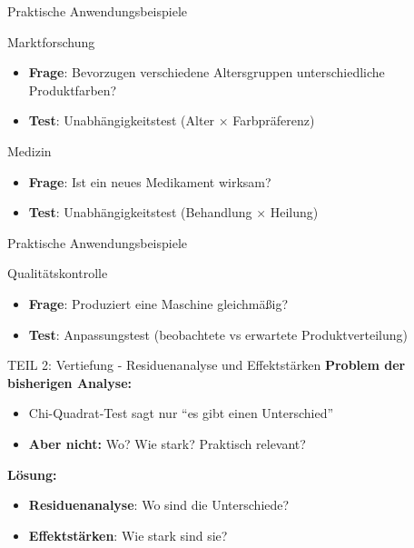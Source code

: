 \documentclass[
  ignorenonframetext,
]{beamer}
\providecommand{\tightlist}{%
  \setlength{\itemsep}{0pt}\setlength{\parskip}{0pt}}
\begin{document}
\begin{frame}{Praktische Anwendungsbeispiele}
\protect{}\label{praktische-anwendungsbeispiele-1}
\begin{block}{Marktforschung}
\protect{}\label{marktforschung}
\begin{itemize}
\tightlist
\item
  \textbf{Frage}: Bevorzugen verschiedene Altersgruppen unterschiedliche
  Produktfarben?
\item
  \textbf{Test}: Unabhängigkeitstest (Alter × Farbpräferenz)
\end{itemize}
\end{block}

\begin{block}{Medizin}
\protect{}\label{medizin}
\begin{itemize}
\tightlist
\item
  \textbf{Frage}: Ist ein neues Medikament wirksam?
\item
  \textbf{Test}: Unabhängigkeitstest (Behandlung × Heilung)
\end{itemize}
\end{block}
\end{frame}

\begin{frame}{Praktische Anwendungsbeispiele}
\protect{}\label{praktische-anwendungsbeispiele-2}
\begin{block}{Qualitätskontrolle}
\protect{}\label{qualituxe4tskontrolle}
\begin{itemize}
\tightlist
\item
  \textbf{Frage}: Produziert eine Maschine gleichmäßig?
\item
  \textbf{Test}: Anpassungstest (beobachtete vs erwartete
  Produktverteilung)
\end{itemize}
\end{block}
\end{frame}

\begin{frame}{TEIL 2: Vertiefung - Residuenanalyse und Effektstärken}
\protect{}\label{teil-2-vertiefung---residuenanalyse-und-effektstuxe4rken}
\textbf{Problem der bisherigen Analyse:}

\begin{itemize}
\tightlist
\item
  Chi-Quadrat-Test sagt nur ``es gibt einen Unterschied''
\item
  \textbf{Aber nicht:} Wo? Wie stark? Praktisch relevant?
\end{itemize}

\textbf{Lösung:}

\begin{itemize}
\tightlist
\item
  \textbf{Residuenanalyse}: Wo sind die Unterschiede?
\item
  \textbf{Effektstärken}: Wie stark sind sie?
\end{itemize}
\end{frame}
\end{document}
